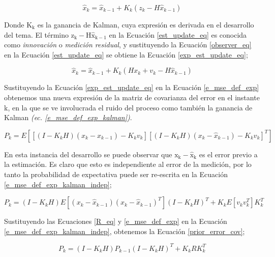 \documentclass[10pt, a4paper]{report}
\begin{document}
\begin{equation}
    \hat{x}_k = \hat{x}_{k-1} + K_k\left(z_k - H\hat{x}_{k-1}\right)
    \label{est_update_eq}
\end{equation}

Donde $\mathrm{K_k}$ es la ganancia de Kalman, cuya expresi\'on es derivada en
el desarrollo del tema. El t\'ermino $\mathrm{z_k - H\hat{x}_{k-1}}$ en la
Ecuaci\'on \ref{est_update_eq} es conocida como \emph{innovaci\'on} o
\emph{medici\'on residual}, y sustituyendo la Ecuaci\'on \ref{observer_eq} en la
Ecuaci\'on \ref{est_update_eq} se obtiene la Ecuaci\'on \ref{exp_est_update_eq};

\begin{equation}
    \hat{x}_k = \hat{x}_{k-1} + K_k\left(Hx_k + v_k - H\hat{x}_{k-1}\right)
    \label{exp_est_update_eq}
\end{equation}

Sustituyendo la Ecuaci\'on \ref{exp_est_update_eq} en la Ecuaci\'on
\ref{e_mse_def_exp} obtenemos una nueva expresi\'on de la matriz de covarianza
del error en el instante k, en la que se ve involucrada el ruido del proceso
como tambi\'en la ganancia de Kalman \emph{(ec. \ref{e_mse_def_exp_kalman})}.

\begin{equation}
    P_k = E\left[\left[\left(I - K_kH\right)\left(x_k - \hat{x}_{k-1}\right) -
    K_kv_k\right]\left[\left(I - K_kH\right)\left(x_k -\hat{x}_{k-1}\right) -
    K_kv_k\right]^T\right] \label{e_mse_def_exp_kalman}
\end{equation}

En esta instancia del desarrollo se puede observar que $\mathrm{x_k - \hat{x}_k}$
es el error previo a la estimaci\'on. Es claro que esto es independiente al
error de la medici\'on, por lo tanto la probabilidad de expectativa puede ser
re-escrita en la Ecuaci\'on \ref{e_mse_def_exp_kalman_indep};

\begin{equation}
    P_k = \left(I - K_kH\right)E\left[\left(x_k - \hat{x}_{k-1}\right)\left(x_k
        - \hat{x}_{k-1}\right)^T\right]\left(I - K_kH\right)^T +
        K_kE\left[v_kv_k^T\right]K_k^T\label{e_mse_def_exp_kalman_indep}
\end{equation}

Sustituyendo las Ecuaciones \ref{R_eq} y \ref{e_mse_def_exp} en la Ecuaci\'on
\ref{e_mse_def_exp_kalman_indep}, obtenemos la Ecuaci\'on \ref{prior_error_cov};

\begin{equation}
    P_k = \left(I - K_kH\right)P_{k-1}\left(I-K_kH\right)^T + K_kRK_k^T \label{prior_error_cov}
\end{equation}
\end{document}
